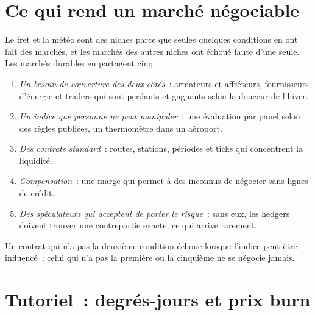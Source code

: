 \section{Ce qui rend un marché négociable}

Le fret et la météo sont des niches parce que seules quelques conditions en ont fait des marchés, et les marchés des autres niches
ont échoué faute d'une seule. Les marchés durables en partagent cinq~:
\begin{enumerate}
\item \emph{Un besoin de couverture des deux côtés}~: armateurs et affréteurs, fournisseurs d'énergie et traders qui
sont perdants et gagnants selon la douceur de l'hiver.
\item \emph{Un indice que personne ne peut manipuler}~: une évaluation par panel selon des règles publiées, un thermomètre dans un
aéroport.
\item \emph{Des contrats standard}~: routes, stations, périodes et ticks qui concentrent la liquidité.
\item \emph{Compensation}~: une marge qui permet à des inconnus de négocier sans lignes de crédit.
\item \emph{Des spéculateurs qui acceptent de porter le risque}~: sans eux, les hedgers doivent trouver une contrepartie exacte,
ce qui arrive rarement.
\end{enumerate}
Un contrat qui n'a pas la deuxième condition échoue lorsque l'indice peut être influencé~; celui qui n'a pas la première ou la
cinquième ne se négocie jamais.

\section{Tutoriel~: degrés-jours et prix burn}\label{tut:m3:freight-weather-and-other-corners:burn}

